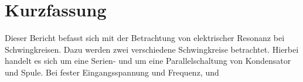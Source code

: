 
\section{Kurzfassung}

Dieser Bericht befasst sich mit der Betrachtung von elektrischer Resonanz bei Schwingkreisen.
Dazu werden zwei verschiedene Schwingkreise betrachtet.
Hierbei handelt es sich um eine Serien- und um eine Parallelschaltung von Kondensator und Spule.
Bei fester Eingangsspannung und Frequenz, und 